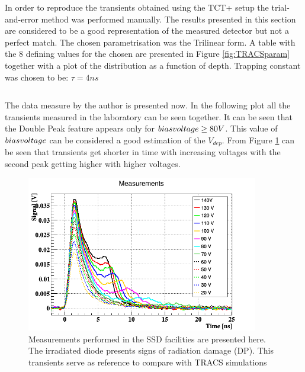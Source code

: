 
In order to reproduce the transients obtained using the TCT+ setup the trial-and-error method was performed manually. The results presented in this section are considered to be a good representation of the measured detector but not a perfect match. The chosen \neff parametrisation was the Trilinear form. A table with the 8 defining values for the chosen \neff are presented in Figure \ref{fig:TRACSparam} together with a plot of the \neff distribution as a function of depth. Trapping constant was chosen to be: $\tau = 4 ns$

\begin{centering}
\begin{tabular}{c}
	

\end{tabular}
\end{centering}

The data measure by the author is presented now. In the following plot all the transients measured in the laboratory can be seen together. It can be seen that the Double Peak feature appears only for $bias voltage \geq 80 V$. This value of $bias voltage$ can be considered a good estimation of the $V_{dep}$. From Figure \ref{fig:allTCT+} can be seen that transients get shorter in time with increasing voltages with the second peak getting higher with higher voltages. 

\begin{figure}[H]
	\centering
	\includegraphics[width=0.9\textwidth]{c1.png}
	\caption{Measurements performed in the SSD facilities are presented here. The irradiated diode presents signs of radiation damage (DP). This transients serve as reference to compare with TRACS simulations}
	\label{fig:allTCT+}
\end{figure}
				
